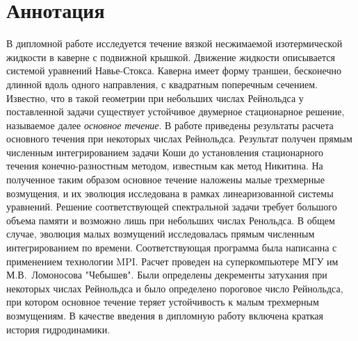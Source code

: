 \documentclass{scrartcl}
\begin{document}
\section{Аннотация}
  В дипломной работе исследуется течение вязкой несжимаемой изотермической жидкости в каверне с подвижной крышкой. 
  Движение жидкости описывается системой уравнений Навье-Стокса. Каверна имеет форму траншеи, бесконечно длинной 
  вдоль одного направления, с квадратным поперечным сечением. Известно, что в такой геометрии при небольших числах 
  Рейнольдса у поставленной задачи
  существует устойчивое двумерное стационарное решение, называемое далее \textit{основное течение}. В работе приведены результаты
  расчета основного течения при некоторых числах Рейнольдса. Результат получен прямым численным интегрированием задачи 
  Коши до установления стационарного течения конечно-разностным методом, известным как метод Никитина. 
  На полученное таким образом основное течение наложены малые 
  трехмерные возмущения, и их эволюция исследована в рамках линеаризованной системы уравнений. Решение 
  соответствующей спектральной задачи требует большого объема памяти и возможно лишь при небольших числах Ренольдса.
  В общем случае, эволюция малых возмущений исследовалась прямым численным интегрированием по времени. 
  Соответствующая программа была написанна с применением технологии MPI. Расчет проведен на суперкомпьютере 
  МГУ им М.В.~Ломоносова "Чебышев". Были определены декременты затухания при некоторых числах Рейнольдса и было 
  определено пороговое число Рейнольдса, при котором основное течение теряет устойчивость к малым трехмерным возмущениям. 
  В качестве введения в дипломную работу включена краткая история гидродинамики.

\newpage  
  
  
%  
%  
  
  
%  
  
\end{document}
